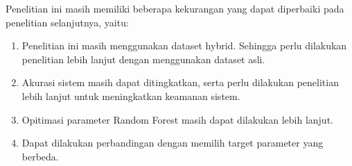 Penelitian ini masih memiliki beberapa kekurangan yang dapat diperbaiki pada penelitian selanjutnya, yaitu:
\begin{enumerate}
	\item Penelitian ini masih menggunakan dataset hybrid. Sehingga perlu dilakukan penelitian lebih lanjut dengan menggunakan dataset asli.
	\item Akurasi sistem masih dapat ditingkatkan, serta perlu dilakukan penelitian lebih lanjut untuk meningkatkan keamanan sistem.
	\item Opitimasi parameter Random Forest masih dapat dilakukan lebih lanjut.
	\item Dapat dilakukan perbandingan dengan memilih target parameter yang berbeda.
\end{enumerate}
